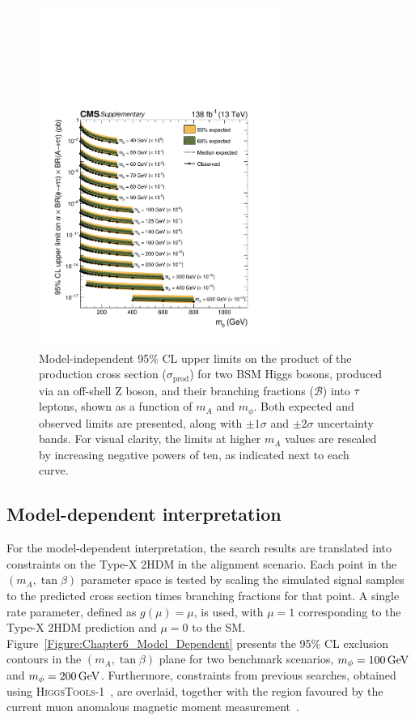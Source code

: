 \begin{figure}[!htbp]
    \centering        
    \includegraphics[width=0.7\textwidth]{Figures/Chapter6/model_independent_limit_all.pdf}
    \caption[Observed and expected 95\% CL upper limits on $\sigma_\text{prod} \times \mathcal{B}(\phi\to\tau\tau)\times\mathcal{B}(A\to\tau\tau)$]{Model-independent 95\% CL upper limits on the product of the production cross section ($\sigma_\text{prod}$) for two \ac{BSM} Higgs bosons, produced via an off-shell Z boson, and their branching fractions ($\mathcal{B}$) into $\tau$ leptons, shown as a function of $m_A$ and $m_\phi$. Both expected and observed limits are presented, along with $\pm1\sigma$ and $\pm2\sigma$ uncertainty bands. For visual clarity, the limits at higher $m_A$ values are rescaled by increasing negative powers of ten, as indicated next to each curve.}
    \label{Figure:Chapter6_model_independent_all}
\end{figure}

\newpage
\subsection{Model-dependent interpretation}

For the model-dependent interpretation, the search results are translated into constraints on the Type-X \ac{2HDM} in the alignment scenario.  Each point in the $(m_A, \tan\beta)$ parameter space is tested by scaling the simulated signal samples to the predicted cross section times branching fractions for that point. A single rate parameter, defined as $g(\mu)=\mu$, is used, with $\mu=1$ corresponding to the Type-X \ac{2HDM} prediction and $\mu=0$ to the \ac{SM}. Figure~\ref{Figure:Chapter6_Model_Dependent} presents the 95\% CL exclusion contours in the $(m_A, \tan\beta)$ plane for two benchmark scenarios, $m_\phi = 100\,\text{Ge\hspace{-.08em}V}$ and $m_\phi = 200\,\text{Ge\hspace{-.08em}V}$. Furthermore, constraints from previous searches, obtained using \textsc{HiggsTools-1}~\cite{Bahl:2022igd}, are overlaid, together with the region favoured by the current muon anomalous magnetic moment measurement~\cite{TypeX_2HDM}.

